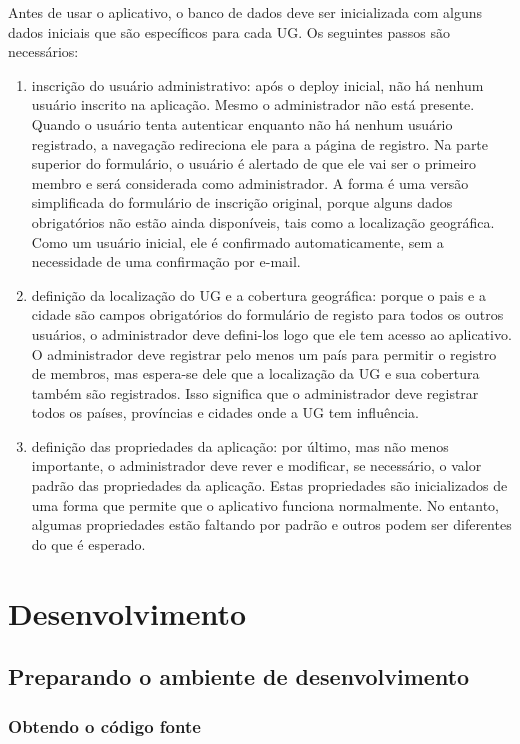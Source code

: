 \documentclass[envcountsame,envcountchap]{svmono}
\begin{document}
Antes de usar o aplicativo, o banco de dados deve ser inicializada com alguns dados iniciais que são específicos para cada UG. Os seguintes passos são necessários:

\begin{enumerate}
\item inscrição do usuário administrativo: após o deploy inicial, não há nenhum usuário inscrito na aplicação. Mesmo o administrador não está presente. Quando o usuário tenta autenticar enquanto não há nenhum usuário registrado, a navegação redireciona ele para a página de registro. Na parte superior do formulário, o usuário é alertado de que ele vai ser o primeiro membro e será considerada como administrador. A forma é uma versão simplificada do formulário de inscrição original, porque alguns dados obrigatórios não estão ainda disponíveis, tais como a localização geográfica. Como um usuário inicial, ele é confirmado automaticamente, sem a necessidade de uma confirmação por e-mail.
\item definição da localização do UG e a cobertura geográfica: porque o pais e a cidade são campos obrigatórios do formulário de registo para todos os outros usuários, o administrador deve defini-los logo que ele tem acesso ao aplicativo. O administrador deve registrar pelo menos um país para permitir o registro de membros, mas espera-se dele que a localização da UG e sua cobertura também são registrados. Isso significa que o administrador deve registrar todos os países, províncias e cidades onde a UG tem influência.
\item definição das propriedades da aplicação: por último, mas não menos importante, o administrador deve rever e modificar, se necessário, o valor padrão das propriedades da aplicação. Estas propriedades são inicializados de uma forma que permite que o aplicativo funciona normalmente. No entanto, algumas propriedades estão faltando por padrão e outros podem ser diferentes do que é esperado.
\end{enumerate}

\chapter{Desenvolvimento}

\section{Preparando o ambiente de desenvolvimento}

\subsection{Obtendo o código fonte}
\label{ssec:obtaining-source-code}
\end{document}
